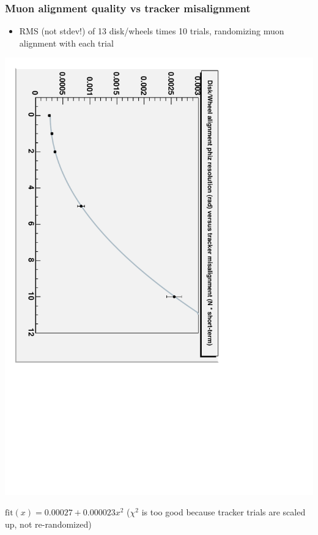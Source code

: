 \documentclass[compress]{beamer}
\begin{document}
\begin{frame}
\frametitle{Muon alignment quality vs tracker misalignment}
\begin{itemize}
\item RMS (not stdev!) of 13 disk/wheels times 10 trials, randomizing
muon alignment with each trial
\end{itemize}

\vfill
\begin{center}
\includegraphics[height=0.6\linewidth, angle=90]{vstracker.pdf}
\end{center}

\vfill \center $\mbox{fit}(x) = 0.00027 + 0.000023 x^2$ ($\chi^2$ is too good because tracker trials are scaled up, not re-randomized)
\end{frame}
\end{document}
